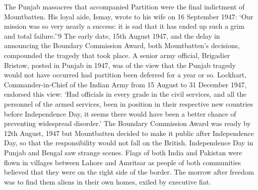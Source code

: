 \begin{multicols}{2}
The Punjab massacres that accompanied Partition were the final indictment of Mountbatten. His loyal aide, Ismay, wrote to his wife on 16 September 1947: `Our mission was so very nearly a success: it is sad that it has ended up such a grim and total failure.''9 The early date, 15th August 1947, and the delay in announcing the Boundary Commission Award, both Mountbatten's decisions, compounded the tragedy that took place. A senior army official, Brigadier Bristow, posted in Punjab in 1947, was of the view that the Punjab tragedy would not have occurred had partition been deferred for a year or so. Lockhart, Commander-in-Chief of the Indian Army from 15 August to 31 December 1947, endorsed this view: `Had officials in every grade in the civil services, and all the personnel of the armed services, been in position in their respective new countries before Independence Day, it seems there would have been a better chance of preventing widespread disorder.' The Boundary Commission Award was ready by 12th August, 1947 but Mountbatten decided to make it public after Independence Day, so that the responsibility would not fall on the British. Independence Day in Punjab and Bengal saw strange scenes. Flags of both India and Pakistan were flown in villages between Lahore and Amritsar as people of both communities believed that they were on the right side of the border. The morrow after freedom was to find them aliens in their own homes, exiled by executive fiat. 


\end{multicols}
